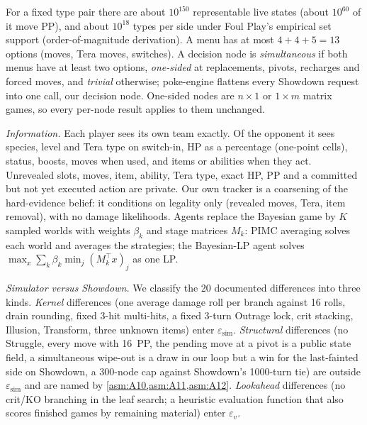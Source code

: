 \documentclass[10pt]{article}
\theoremstyle{plain}
\theoremstyle{definition}
\theoremstyle{remark}
\newcommand{\epsv}{\varepsilon_v}
\newcommand{\epssim}{\varepsilon_{\mathrm{sim}}}
\begin{document}
For a fixed type pair there are about $10^{150}$ representable live states (about $10^{60}$ of it move PP), and about
$10^{18}$ types per side under Foul Play's empirical set support (order-of-magnitude derivation). A menu has at most
$4+4+5=13$ options (moves, Tera moves, switches). A decision node is \emph{simultaneous} if both menus have at least two
options, \emph{one-sided} at replacements, pivots, recharges and forced moves, and \emph{trivial} otherwise;
poke-engine flattens every Showdown request into one call, our decision node. One-sided nodes are $n\times1$ or
$1\times m$ matrix games, so every per-node result applies to them unchanged.

\emph{Information.} Each player sees its own team exactly. Of the opponent it sees species, level and Tera type on
switch-in, HP as a percentage (one-point cells), status, boosts, moves when used, and items or abilities when they act.
Unrevealed slots, moves, item, ability, Tera type, exact HP, PP and a committed but not yet executed action are private.
Our own tracker is a coarsening of the hard-evidence belief: it conditions on legality only (revealed moves, Tera, item
removal), with no damage likelihoods. Agents replace the Bayesian game by $K$ sampled worlds with weights $\beta_k$ and
stage matrices $M_k$: PIMC averaging solves each world and averages the strategies; the Bayesian-LP agent solves
$\max_x\sum_k\beta_k\min_j(M_k^\top x)_j$ as one LP.

\emph{Simulator versus Showdown.} We classify the 20 documented differences into three kinds. \emph{Kernel}
differences (one average damage roll per branch against 16 rolls, drain rounding, fixed 3-hit multi-hits, a fixed
3-turn Outrage lock, crit stacking, Illusion, Transform, three unknown items) enter $\epssim$. \emph{Structural}
differences (no Struggle, every move with 16~PP, the pending move at a pivot is a public state field, a simultaneous
wipe-out is a draw in our loop but a win for the last-fainted side on Showdown, a 300-node cap against Showdown's
1000-turn tie) are outside $\epssim$ and are named by \cref{asm:A10,asm:A11,asm:A12}. \emph{Lookahead} differences
(no crit/KO branching in the leaf search; a heuristic evaluation function that also scores finished games by remaining material)
enter $\epsv$.
\end{document}
